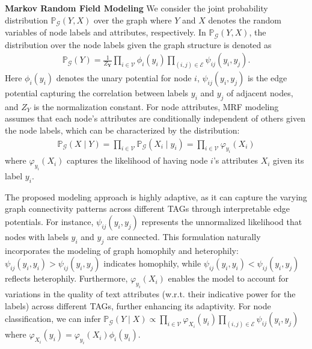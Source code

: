\textbf{Markov Random Field Modeling} We consider the joint probability distribution $\mathbb{P}_\mathcal{G}(Y, X)$ over the graph where $Y$ and $X$ denotes the random variables of node labels and attributes, respectively. %
In $\mathbb{P}_\mathcal{G}(Y, X)$, the distribution over the node labels given the graph structure is denoted as
\begin{align}
\mathbb{P}_\mathcal{G}(Y)
= \frac{1}{Z_{\mathbf{Y}}} \prod_{i \in \mathcal{V}} \phi_i(y_i) \prod_{(i,j) \in \mathcal{E}} \psi_{ij}(y_i, y_j).
\end{align}
Here $\phi_i(y_i)$ denotes the unary potential for node $i$, $\psi_{ij}(y_i, y_j)$ is the edge potential capturing the correlation between labels $y_i$ and $y_j$ of adjacent nodes, and $Z_{Y}$ is the normalization constant.  For node attributes, MRF modeling assumes that each node’s attributes are conditionally independent of others given the node labels, which can be characterized by the distribution:  
\begin{align}
\mathbb{P}_\mathcal{G}(X \mid Y) 
= \prod_{i \in \mathcal{V}} \mathbb{P}_\mathcal{G}(X_i \mid y_i) 
= \prod_{i \in \mathcal{V}} \varphi_{y_i}(X_i)
\end{align}
where $\varphi_{y_i}(X_i)$ captures the likelihood of having node $i$’s attributes $X_i$ given its label $y_i$. %

The proposed modeling approach is highly adaptive, as it can capture the varying graph connectivity patterns across different TAGs through interpretable edge potentials. For instance, $\psi_{ij}(y_i, y_j)$ represents the unnormalized likelihood that nodes with labels $y_i$ and $y_j$ are connected. This formulation naturally incorporates the modeling of graph homophily and heterophily: $\psi_{ij}(y_i, y_i) > \psi_{ij}(y_i, y_j)$ indicates homophily, while $\psi_{ij}(y_i, y_i) < \psi_{ij}(y_i, y_j)$ reflects heterophily. Furthermore, $\varphi_{y_i}(X_i)$ enables the model to account for variations in the quality of text attributes (w.r.t. their indicative power for the labels) across different TAGs, further enhancing its adaptivity. For node classification, we can infer $\mathbb{P}_\mathcal{G}(Y \mid X) \propto \prod_{i \in \mathcal{V}} \varphi_{X_i}(y_i) 
\prod_{(i,j) \in \mathcal{E}} \psi_{ij}(y_i, y_j)$ where $\varphi_{X_i}(y_i) = \varphi_{y_i}(X_i)\phi_i(y_i)$.



